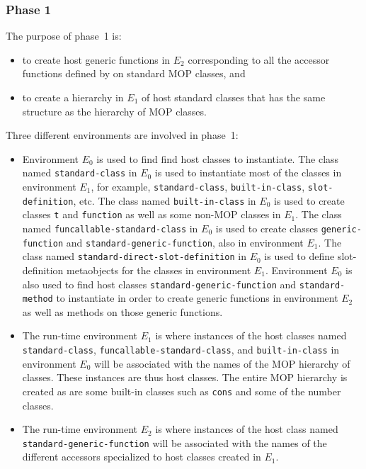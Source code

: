 \subsubsection{Phase 1}

The purpose of phase~1 is:

\begin{itemize}
\item to create host generic functions in $E_2$ corresponding to all
  the accessor functions defined by \sysname{} on standard MOP
  classes, and
\item to create a hierarchy in $E_1$ of host standard classes that has
  the same structure as the hierarchy of MOP classes.
\end{itemize}


Three different environments are involved in phase~1:

\begin{itemize}
\item Environment $E_0$ is used to find find host classes to
  instantiate.  The class named \texttt{standard-class} in $E_0$ is
  used to instantiate most of the classes in environment $E_1$, for
  example, \texttt{standard-class}, \texttt{built-in-class},
  \texttt{slot-definition}, etc.  The class named
  \texttt{built-in-class} in $E_0$ is used to create classes
  \texttt{t} and \texttt{function} as well as some non-MOP classes in
  $E_1$.  The class named \texttt{funcallable-standard-class} in $E_0$
  is used to create classes \texttt{generic-function} and
  \texttt{standard-generic-function}, also in environment $E_1$.  The
  class named \texttt{standard-direct-slot-definition} in $E_0$ is
  used to define slot-definition metaobjects for the classes in
  environment $E_1$.  Environment $E_0$ is also used to find host
  classes \texttt{standard-generic-function} and
  \texttt{standard-method} to instantiate in order to create generic
  functions in environment $E_2$ as well as methods on those generic
  functions.
\item The run-time environment $E_1$ is where instances of the host
  classes named \texttt{standard-class},
  \texttt{funcallable-standard-class}, and \texttt{built-in-class} in
  environment $E_0$ will be associated with the names of the MOP
  hierarchy of classes.  These instances are thus host classes.  The
  entire MOP hierarchy is created as are some built-in classes such as
  \texttt{cons} and some of the number classes.
\item The run-time environment $E_2$ is where instances of the host
  class named \texttt{standard-generic-function} will be associated
  with the names of the different accessors specialized to host
  classes created in $E_1$.
\end{itemize}

